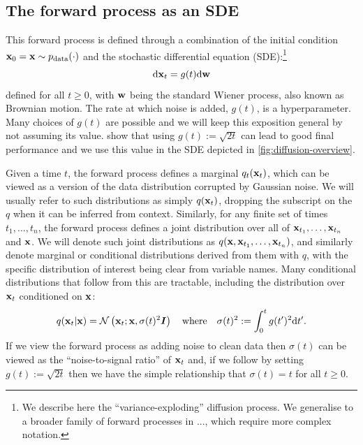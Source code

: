 \subsection{The forward process as an SDE} \label{sec:diffusion-forward-sde}
This forward process is defined through a combination of the initial condition ${\mathbf{x}}_0 = {\mathbf{x}} \sim p_{\rm{data}}(\cdot)$ and the stochastic differential equation (SDE):\footnote{We describe here the ``variance-exploding'' diffusion process. We generalise to a broader family of forward processes in ..., which require more complex notation.}
\begin{equation} \label{eq:forward-diffusion}
    \mathrm{d}{\mathbf{x}}_t = g(t) \mathrm{d}{\mathbf{w}}
\end{equation}
defined for all $t \geq 0$, with ${\mathbf{w}}$ being the standard Wiener process, also known as Brownian motion. The rate at which noise is added, $g(t)$, is a hyperparameter. Many choices of $g(t)$ are possible and we will keep this exposition general by not assuming its value. \citet{karras2022elucidating} show that using $g(t) := \sqrt{2t}$ can lead to good final performance and we use this value in the SDE depicted in \cref{fig:diffusion-overview}.

Given a time $t$, the forward process defines a marginal $q_t({\mathbf{x}}_t)$, which can be viewed as a version of the data distribution corrupted by Gaussian noise. We will usually refer to such distributions as simply $q({\mathbf{x}}_t)$, dropping the subscript on the $q$ when it can be inferred from context. Similarly, for any finite set of times $t_1,\ldots,t_n$, the forward process defines a joint distribution over all of ${\mathbf{x}}_{t_1},\ldots,{\mathbf{x}}_{t_n}$ and ${\mathbf{x}}$. We will denote such joint distributions as $q({\mathbf{x}},{\mathbf{x}}_{t_1},\ldots,{\mathbf{x}}_{t_n})$, and similarly denote marginal or conditional distributions derived from them with $q$, with the specific distribution of interest being clear from variable names. Many conditional distributions that follow from this are tractable, including the distribution over ${\mathbf{x}}_t$ conditioned on ${\mathbf{x}}$:
\begin{equation}
    q({\mathbf{x}}_t|{\mathbf{x}}) = {\mathcal{N}} \left( {\mathbf{x}}_t; {\mathbf{x}}, \sigma(t)^2 {\bm{I}} \right) \quad \text{where} \quad \sigma(t)^2 := \int_0^t g(t')^2 \mathrm{d}t'.
\end{equation}
If we view the forward process as adding noise to clean data then $\sigma(t)$ can be viewed as the ``noise-to-signal ratio'' of ${\mathbf{x}}_t$ and, if we follow \citet{karras2022elucidating} by setting $g(t) := \sqrt{2t}$ then we have the simple relationship that $\sigma(t) = t$ for all $t\geq0$.

